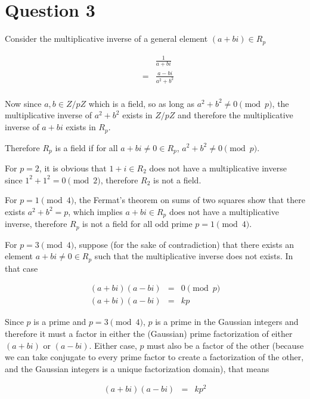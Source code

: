 \section*{Question 3}
Consider the multiplicative inverse of a general element $ (a + bi) \in R_p $ 

\begin{eqnarray*}
  & & \frac{1}{a + bi} \\
  &=& \frac{a - bi}{a^2 + b^2} \\
\end{eqnarray*}

Now since $ a, b \in Z/pZ $ which is a field, so as long as $ a^2 + b^2 \ne 0 \pmod{p} $, the multiplicative inverse of $ a^2 + b^2 $ exists in $ Z/pZ $ and therefore the multiplicative inverse of $ a + bi $ exists in $ R_p $.

Therefore $ R_p $ is a field if for all $ a + bi \ne 0 \in R_p $, $ a^2 + b^2 \ne 0 \pmod{p} $.

For $ p = 2 $, it is obvious that $ 1 + i \in R_2 $ does not have a multiplicative inverse since $ 1^2 + 1^2 = 0 \pmod{2} $, therefore $ R_2 $ is not a field.

For $ p = 1 \pmod{4} $, the Fermat's theorem on sums of two squares show that there exists $ a^2 + b^2 = p $, which implies $ a + bi \in R_p $ does not have a multiplicative inverse, therefore $ R_p $ is not a field for all odd prime $ p = 1 \pmod{4} $.

For $ p = 3 \pmod{4} $, suppose (for the sake of contradiction) that there exists an element $ a + bi \ne 0 \in R_p $ such that the multiplicative inverse does not exists. In that case

\begin{eqnarray*}
  (a + bi)(a - bi) &=& 0 \pmod{p} \\
  (a + bi)(a - bi) &=& kp 
\end{eqnarray*}

Since $ p $ is a prime and $ p = 3 \pmod{4} $, $ p $ is a prime in the Gaussian integers and therefore it must a factor in either the (Gaussian) prime factorization of either $ (a+bi) $ or $ (a-bi) $. Either case, $ p $ must also be a factor of the other (because we can take conjugate to every prime factor to create a factorization of the other, and the Gaussian integers is a unique factorization domain), that means

\begin{eqnarray*}
  (a + bi)(a - bi) &=& kp^2 
\end{eqnarray*}

